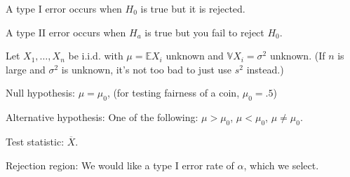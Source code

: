 \documentclass{article}
\begin{document}
\medskip
{}

    A type I error occurs when $H_0$ is true but it is rejected.

\medskip
{}

    A type II error occurs when $H_a$ is true but you fail to reject $H_0$.

\medskip
{}

    Let $X_1, \hdots, X_n$ be i.i.d. with $\mu = \mathbb EX_i$ unknown and $\mathbb VX_i = \sigma^2$ unknown. (If $n$ is large and $\sigma^2$ is unknown, it's not too bad to just use $s^2$ instead.)

    Null hypothesis: $\mu = \mu_0$, (for testing fairness of a coin, $\mu_0 = .5$)

    Alternative hypothesis: One of the following: $\mu > \mu_0$, $\mu < \mu_0$, $\mu \neq \mu_0$.

    Test statistic: $\overline X$.

    Rejection region: We would like a type I error rate of $\alpha$, which we select.
\end{document}
